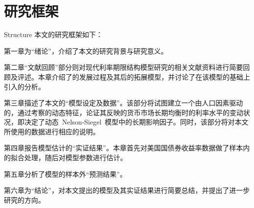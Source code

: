 \section{研究框架}{Structure}
本文的研究框架如下：

第一章为``绪论''，介绍了本文的研究背景与研究意义。

第二章``文献回顾''部分则对现代利率期限结构模型研究的相关文献资料进行简要回顾及评述。本章介绍了\dns 的发展过程及其后的拓展模型，并讨论了在该模型的基础上引入\dsf 的分析。

第三章描述了本文的``模型设定及数据''。该部分将试图建立一个由人口因素驱动的\dns{}，通过考察\ds 的动态特征，论证其反映的货币市场长期均衡时的利率水平的变动状况，即\dsf 决定了动态~Nelson-Siegel~模型中的长期影响因子。同时，该部分将对本文所使用的数据进行相应的说明。

第四章报告模型估计的``实证结果''。本章首先对美国国债券收益率数据做了样本内的拟合处理，随后对模型参数进行估计。

第五章分析了模型的样本外``预测结果''。

第六章为``结论''，对本文提出的模型及其实证结果进行简要总结，并提出了进一步研究的方向。





